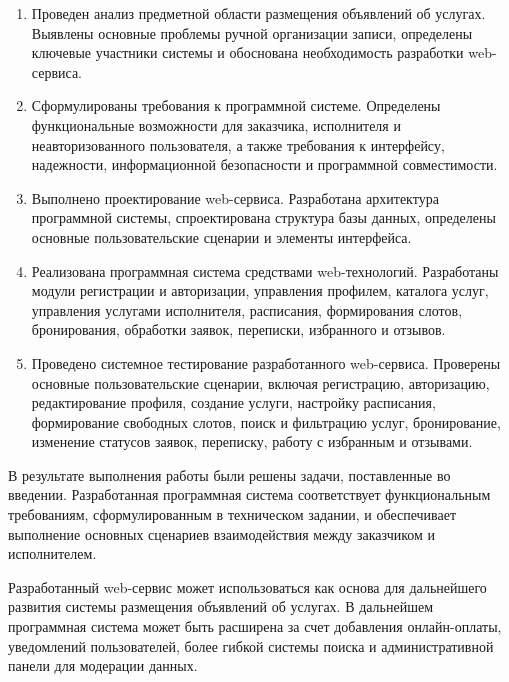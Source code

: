 \begin{enumerate}
	\item Проведен анализ предметной области размещения объявлений об услугах. Выявлены основные проблемы ручной организации записи, определены ключевые участники системы и обоснована необходимость разработки web-сервиса.
	\item Сформулированы требования к программной системе. Определены функциональные возможности для заказчика, исполнителя и неавторизованного пользователя, а также требования к интерфейсу, надежности, информационной безопасности и программной совместимости.
	\item Выполнено проектирование web-сервиса. Разработана архитектура программной системы, спроектирована структура базы данных, определены основные пользовательские сценарии и элементы интерфейса.
	\item Реализована программная система средствами web-технологий. Разработаны модули регистрации и авторизации, управления профилем, каталога услуг, управления услугами исполнителя, расписания, формирования слотов, бронирования, обработки заявок, переписки, избранного и отзывов.
	\item Проведено системное тестирование разработанного web-сервиса. Проверены основные пользовательские сценарии, включая регистрацию, авторизацию, редактирование профиля, создание услуги, настройку расписания, формирование свободных слотов, поиск и фильтрацию услуг, бронирование, изменение статусов заявок, переписку, работу с избранным и отзывами.
\end{enumerate}

В результате выполнения работы были решены задачи, поставленные во введении. Разработанная программная система соответствует функциональным требованиям, сформулированным в техническом задании, и обеспечивает выполнение основных сценариев взаимодействия между заказчиком и исполнителем.

Разработанный web-сервис может использоваться как основа для дальнейшего развития системы размещения объявлений об услугах. В дальнейшем программная система может быть расширена за счет добавления онлайн-оплаты, уведомлений пользователей, более гибкой системы поиска и административной панели для модерации данных.